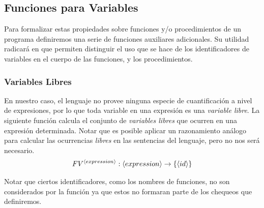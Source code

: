 
\subsection{Funciones para Variables}

Para formalizar estas propiedades sobre funciones y/o procedimientos de un programa definiremos una serie de funciones auxiliares adicionales.
Su utilidad radicará en que permiten distinguir el uso que se hace de los identificadores de variables en el cuerpo de las funciones, y los procedimientos. %

\subsubsection{Variables Libres}

En nuestro caso, el lenguaje no provee ninguna especie de cuantificación a nivel de expresiones, por lo que toda variable en una expresión es una \textit{variable libre}.
La siguiente función calcula el conjunto de \textit{variables libres} que ocurren en una expresión determinada.
Notar que es posible aplicar un razonamiento análogo para calcular las ocurrencias \textit{libres} en las sentencias del lenguaje, pero no nos será necesario. %
\begin{gather*}
FV^{\langle expression \rangle}: \langle expression \rangle \rightarrow \{ \langle id \rangle \}
\end{gather*}

Notar que ciertos identificadores, como los nombres de funciones, no son considerados por la función ya que estos no formaran parte de los chequeos que
definiremos.

